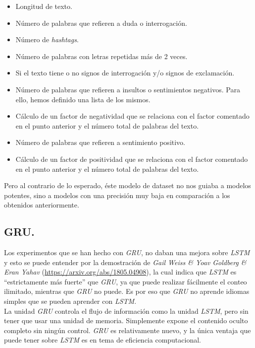 \documentclass[11pt]{article}
\begin{document}
\begin{itemize}
    \item Longitud de texto.
    \item Número de palabras que refieren a duda o interrogación.
    \item Número de \textit{hashtags}.
    \item Número de palabras con letras repetidas más de 2 veces.
    \item Si el texto tiene o no signos de interrogación y/o signos de exclamación.
    \item Número de palabras que refieren a insultos o sentimientos negativos. Para ello, hemos definido una lista de los mismos.
    \item Cálculo de un factor de negatividad que se relaciona con el factor comentado en el punto anterior y el número total de palabras del texto.
    \item Número de palabras que refieren a sentimiento positivo.
    \item Cálculo de un factor de positividad que se relaciona con el factor comentado en el punto anterior y el número total de palabras del texto.
\end{itemize}
    
Pero al contrario de lo esperado, éste modelo de dataset no nos guiaba a modelos potentes, sino a modelos con una precisión muy baja en comparación a los obtenidos anteriormente.

\subsection{GRU.}

Los experimentos que se han hecho con \textit{GRU}, no daban una mejora sobre \textit{LSTM} y esto se puede entender por la demostración de \textit{Gail Weiss \& Yoav Goldberg \& Eran Yahav} (\href{https://arxiv.org/abs/1805.04908}{https://arxiv.org/abs/1805.04908}), la cual indica que \textit{LSTM} es ``estrictamente más fuerte'' que \textit{GRU}, ya que puede realizar fácilmente el conteo ilimitado, mientras que \textit{GRU} no puede. Es por eso que \textit{GRU} no aprende idiomas simples que se pueden aprender con \textit{LSTM}. \\

La unidad \textit{GRU} controla el flujo de información como la unidad \textit{LSTM}, pero sin tener que usar una unidad de memoria. Simplemente expone el contenido oculto completo sin ningún control. \textit{GRU} es relativamente nuevo, y la única ventaja que puede tener sobre \textit{LSTM} es en tema de eficiencia computacional.
\end{document}
